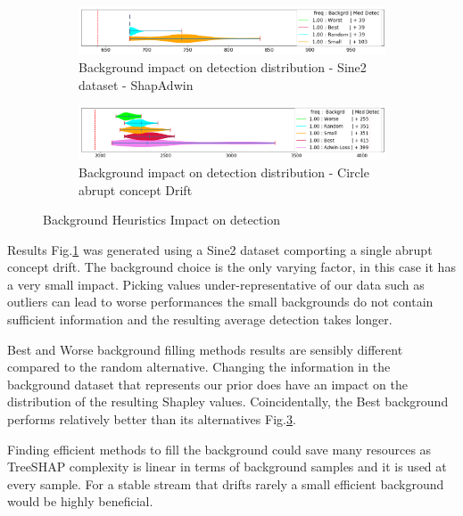 \documentclass[runningheads]{llncs}
\begin{document}
\begin{figure}[htbp]
    \begin{center}
    \begin{subfigure}[b]{0.98\textwidth}
        \centering
        \includegraphics[width=0.9\linewidth]{bgrd_violin.png}
        \caption{Background impact on detection distribution - Sine2 dataset - ShapAdwin}
        \label{fig: Detection Background}
    \end{subfigure}
    \begin{subfigure}[b]{0.98\textwidth}
        \centering 
        \includegraphics[width=0.9\linewidth]{bgrd_worse_best.png}
        \caption{Background impact on detection distribution - Circle abrupt concept Drift}
        \label{fig: Bgrd WorseBest}
    \end{subfigure}
    \caption{Background Heuristics Impact on detection}
    \end{center}
\end{figure}

Results Fig.\ref{fig: Detection Background} was generated using a Sine2 dataset comporting a single abrupt concept drift. The background choice is the only varying factor, in this case it has a very small impact. Picking values under-representative of our data such as outliers can lead to worse performances the small backgrounds do not contain sufficient information and the resulting average detection takes longer.


Best and Worse background filling methods results are sensibly different compared to the random alternative. Changing the information in the background dataset that represents our prior does have an impact on the distribution of the resulting Shapley values. Coincidentally, the Best background performs relatively better than its alternatives Fig.\ref{fig: Bgrd WorseBest}. 

Finding efficient methods to fill the background could save many resources as TreeSHAP complexity is linear in terms of background samples and it is used at every sample. For a stable stream that drifts rarely a small efficient background would be highly beneficial. 
\end{document}
